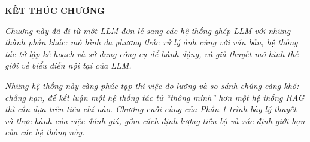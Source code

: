 \begin{center}
	\textbf{\Large KẾT THÚC CHƯƠNG \thechapter}
\end{center}

\textit{Chương này đã đi từ một LLM đơn lẻ sang các hệ thống ghép LLM với những thành phần khác: mô hình đa phương thức xử lý ảnh cùng với văn bản, hệ thống tác tử lập kế hoạch và sử dụng công cụ để hành động, và giả thuyết mô hình thế giới về biểu diễn nội tại của LLM.}

\textit{Những hệ thống này càng phức tạp thì việc đo lường và so sánh chúng càng khó: chẳng hạn, để kết luận một hệ thống tác tử “thông minh” hơn một hệ thống RAG thì cần dựa trên tiêu chí nào. Chương cuối cùng của Phần 1 trình bày lý thuyết và thực hành của việc đánh giá, gồm cách định lượng tiến bộ và xác định giới hạn của các hệ thống này.}